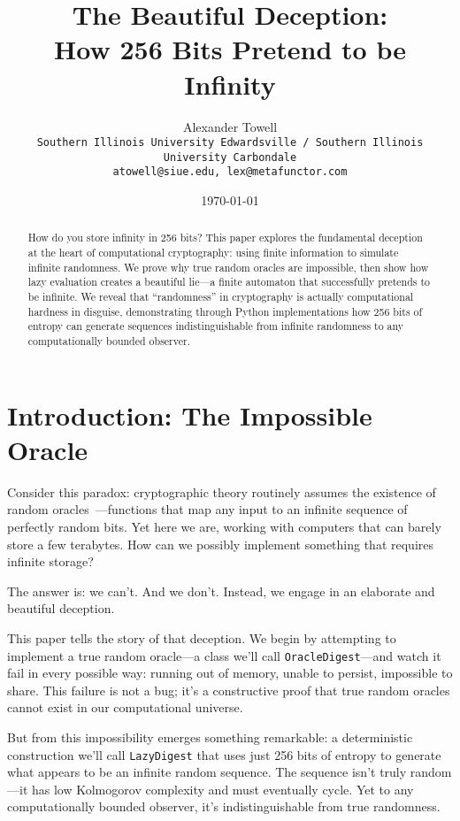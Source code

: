 \documentclass[11pt]{article}
\title{The Beautiful Deception:\\
How 256 Bits Pretend to be Infinity}
\author{
    Alexander Towell\\
    \texttt{Southern Illinois University Edwardsville / Southern Illinois University Carbondale}\\
    \texttt{atowell@siue.edu, lex@metafunctor.com}
}
\date{\today}
\begin{document}
\maketitle

\begin{abstract}
How do you store infinity in 256 bits? This paper explores the fundamental deception at the heart of computational cryptography: using finite information to simulate infinite randomness. We prove why true random oracles are impossible, then show how lazy evaluation creates a beautiful lie---a finite automaton that successfully pretends to be infinite. We reveal that ``randomness'' in cryptography is actually computational hardness in disguise, demonstrating through Python implementations how 256 bits of entropy can generate sequences indistinguishable from infinite randomness to any computationally bounded observer.
\end{abstract}

\section{Introduction: The Impossible Oracle}

Consider this paradox: cryptographic theory routinely assumes the existence of random oracles~\cite{bellare1993random}---functions that map any input to an infinite sequence of perfectly random bits. Yet here we are, working with computers that can barely store a few terabytes. How can we possibly implement something that requires infinite storage?

The answer is: we can't. And we don't. Instead, we engage in an elaborate and beautiful deception.

This paper tells the story of that deception. We begin by attempting to implement a true random oracle---a class we'll call \texttt{OracleDigest}---and watch it fail in every possible way: running out of memory, unable to persist, impossible to share. This failure is not a bug; it's a constructive proof that true random oracles cannot exist in our computational universe.

But from this impossibility emerges something remarkable: a deterministic construction we'll call \texttt{LazyDigest} that uses just 256 bits of entropy to generate what appears to be an infinite random sequence. The sequence isn't truly random---it has low Kolmogorov complexity and must eventually cycle. Yet to any computationally bounded observer, it's indistinguishable from true randomness.
\end{document}
